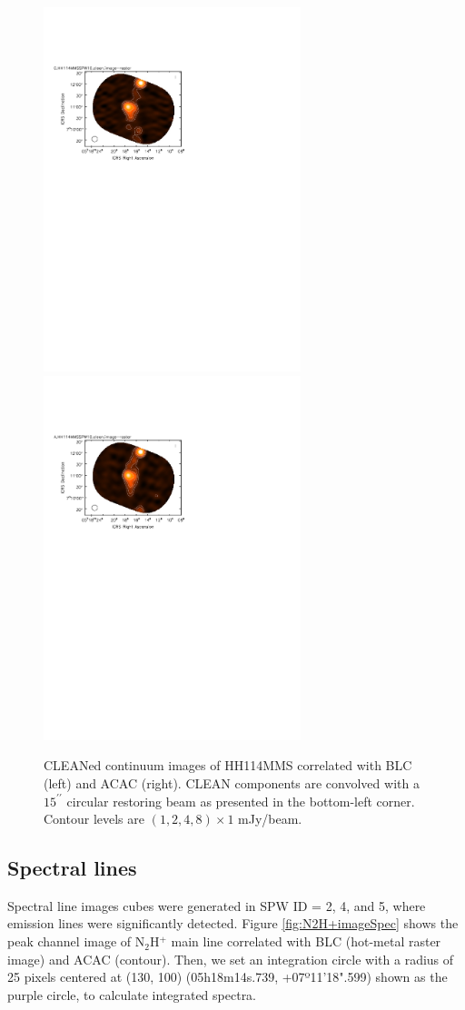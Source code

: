\documentclass[a4paper, 10pt]{scrartcl}
\begin{document}
\begin{figure}[h]
	\centering
	\includegraphics[width=7.5cm]{BLC.HH114MMS.cont.pdf}
	\includegraphics[width=7.5cm]{ACA.HH114MMS.cont.pdf}
	\caption{CLEANed continuum images of HH114MMS correlated with BLC (left) and ACAC (right). CLEAN components are convolved with a $15^{\prime \prime}$ circular restoring beam as presented in the bottom-left corner. Contour levels are $(1, 2, 4, 8) \times 1$ mJy/beam.}\label{fig:contimage}
\end{figure}


\subsection{Spectral lines}\label{subsec:lineimages}
Spectral line images cubes were generated in SPW ID = 2, 4, and 5, where emission lines were significantly detected. Figure \ref{fig:N2H+imageSpec} shows the peak channel image of N$_2$H$^+$ main line correlated with BLC (hot-metal raster image) and ACAC (contour).
Then, we set an integration circle with a radius of 25 pixels centered at (130, 100) (05h18m14s.739, +07º11'18".599) shown as the purple circle, to calculate integrated spectra.
\end{document}

